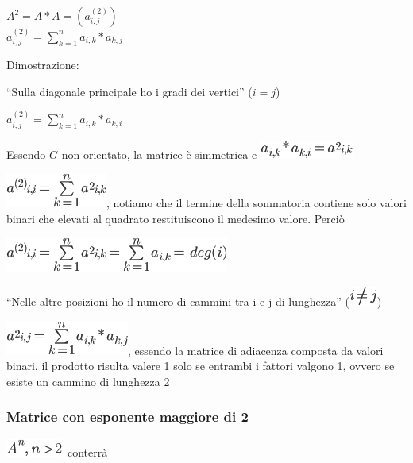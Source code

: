 \documentclass{article}
\begin{document}
{{{{}

$A^2 = A*A = (a^{(2)}_{i,j})$ \\
$a^{(2)}_{i,j}=\sum_{k=1}^{n}{a_{i,k}*a_{k,j}}$

{}

{Dimostrazione:}

{``Sulla diagonale principale ho i gradi dei vertici'' ($i=j$)}

$a^{(2)}_{i,j}=\sum_{k=1}^{n}{a_{i,k}*a_{k,i}}$

{Essendo $G$ non orientato, la matrice è simmetrica e
}\includegraphics{images/image412.png}

\includegraphics{images/image413.png}{, notiamo che il termine della
sommatoria contiene solo valori binari che elevati al quadrato
restituiscono il medesimo valore. Perciò}

\includegraphics{images/image414.png}

{}

{``Nelle altre posizioni ho il numero di cammini tra i e j di
lunghezza'' (}\includegraphics{images/image415.png}{)}

\includegraphics{images/image416.png}{, essendo la matrice di adiacenza
composta da valori binari, il prodotto risulta valere 1 solo se entrambi
i fattori valgono 1, ovvero se esiste un cammino di lunghezza 2}

{}

\hypertarget{h.yvqsj238z2mk}{\subsubsection{\texorpdfstring{{Matrice con
esponente maggiore di
2}}{Matrice con esponente maggiore di 2}}\label{h.yvqsj238z2mk}}

\includegraphics{images/image417.png}{~conterrà}

}}}
\end{document}
